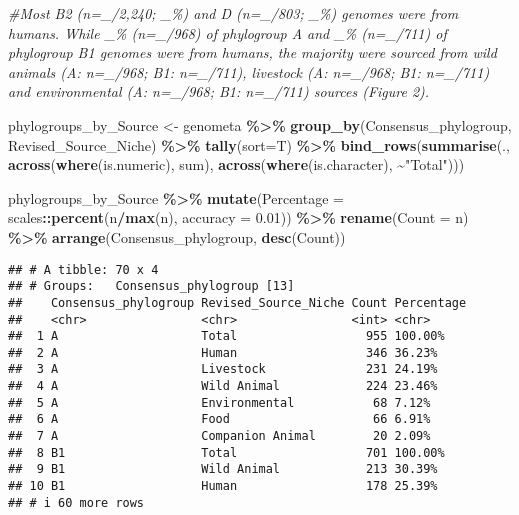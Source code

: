 \documentclass[
]{article}
\newenvironment{Shaded}{\begin{snugshade}}{\end{snugshade}}
\newcommand{\AttributeTok}[1]{\textcolor[rgb]{0.13,0.29,0.53}{#1}}
\newcommand{\CommentTok}[1]{\textcolor[rgb]{0.56,0.35,0.01}{\textit{#1}}}
\newcommand{\FloatTok}[1]{\textcolor[rgb]{0.00,0.00,0.81}{#1}}
\newcommand{\FunctionTok}[1]{\textcolor[rgb]{0.13,0.29,0.53}{\textbf{#1}}}
\newcommand{\NormalTok}[1]{#1}
\newcommand{\OtherTok}[1]{\textcolor[rgb]{0.56,0.35,0.01}{#1}}
\newcommand{\SpecialCharTok}[1]{\textcolor[rgb]{0.81,0.36,0.00}{\textbf{#1}}}
\newcommand{\StringTok}[1]{\textcolor[rgb]{0.31,0.60,0.02}{#1}}
\begin{document}
\begin{Shaded}
\begin{Highlighting}[]
\CommentTok{\#Most B2 (n=\_/2,240; \_\%) and D (n=\_/803; \_\%) genomes were from humans. While \_\% (n=\_/968) of phylogroup A and \_\% (n=\_/711) of phylogroup B1 genomes were from humans, the majority were sourced from wild animals (A: n=\_/968; B1: n=\_/711), livestock (A: n=\_/968; B1: n=\_/711) and environmental (A: n=\_/968; B1: n=\_/711) sources (Figure 2).}

\NormalTok{phylogroups\_by\_Source }\OtherTok{\textless{}{-}}\NormalTok{ genometa }\SpecialCharTok{\%\textgreater{}\%} \FunctionTok{group\_by}\NormalTok{(Consensus\_phylogroup, Revised\_Source\_Niche) }\SpecialCharTok{\%\textgreater{}\%} \FunctionTok{tally}\NormalTok{(}\AttributeTok{sort=}\NormalTok{T)   }\SpecialCharTok{\%\textgreater{}\%} 
  \FunctionTok{bind\_rows}\NormalTok{(}\FunctionTok{summarise}\NormalTok{(.,}
                      \FunctionTok{across}\NormalTok{(}\FunctionTok{where}\NormalTok{(is.numeric), sum),}
                      \FunctionTok{across}\NormalTok{(}\FunctionTok{where}\NormalTok{(is.character), }\SpecialCharTok{\textasciitilde{}}\StringTok{"Total"}\NormalTok{)))}

\NormalTok{phylogroups\_by\_Source }\SpecialCharTok{\%\textgreater{}\%} \FunctionTok{mutate}\NormalTok{(}\AttributeTok{Percentage =}\NormalTok{ scales}\SpecialCharTok{::}\FunctionTok{percent}\NormalTok{(n}\SpecialCharTok{/}\FunctionTok{max}\NormalTok{(n), }\AttributeTok{accuracy =} \FloatTok{0.01}\NormalTok{)) }\SpecialCharTok{\%\textgreater{}\%} \FunctionTok{rename}\NormalTok{(}\StringTok{\textquotesingle{}Count\textquotesingle{}} \OtherTok{=}\NormalTok{ n) }\SpecialCharTok{\%\textgreater{}\%} \FunctionTok{arrange}\NormalTok{(Consensus\_phylogroup, }\FunctionTok{desc}\NormalTok{(Count))}
\end{Highlighting}
\end{Shaded}

\begin{verbatim}
## # A tibble: 70 x 4
## # Groups:   Consensus_phylogroup [13]
##    Consensus_phylogroup Revised_Source_Niche Count Percentage
##    <chr>                <chr>                <int> <chr>     
##  1 A                    Total                  955 100.00%   
##  2 A                    Human                  346 36.23%    
##  3 A                    Livestock              231 24.19%    
##  4 A                    Wild Animal            224 23.46%    
##  5 A                    Environmental           68 7.12%     
##  6 A                    Food                    66 6.91%     
##  7 A                    Companion Animal        20 2.09%     
##  8 B1                   Total                  701 100.00%   
##  9 B1                   Wild Animal            213 30.39%    
## 10 B1                   Human                  178 25.39%    
## # i 60 more rows
\end{verbatim}
\end{document}
